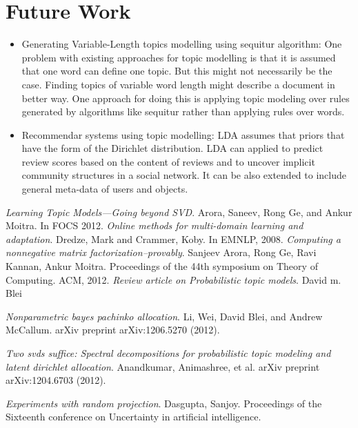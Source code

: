 \documentclass[a4paper,11pt]{article}
\begin{document}
\section{Future Work}

\begin{itemize}

\item Generating Variable-Length topics modelling using sequitur algorithm:
	One problem with existing approaches for topic modelling is that it is assumed that one word can define one topic. But this might not necessarily be the case. Finding topics of variable word length might describe a document in better way. One approach for doing this is applying topic modeling over rules generated by algorithms like sequitur rather than applying rules over words.

\item Recommendar systems using topic modelling:
	LDA assumes that priors that have the form of the Dirichlet distribution. LDA can applied to predict review scores based on the content of reviews and to uncover implicit community structures in a social network. It can be also extended to include general meta-data of users and objects.

\end{itemize}


\begin{thebibliography}{99}
 \textit{Learning Topic Models---Going beyond SVD}. Arora, Saneev, Rong Ge, and Ankur Moitra. In FOCS 2012.
 \textit{Online methods for multi-domain learning and adaptation}. Dredze, Mark and Crammer, Koby. In
EMNLP, 2008.
 \textit{Computing a nonnegative matrix factorization--provably}. Sanjeev Arora, Rong Ge, Ravi Kannan, Ankur Moitra. Proceedings of the 44th symposium on Theory of Computing. ACM, 2012.  
 \textit{Review article on Probabilistic topic models}. David m. Blei  

 \textit{Nonparametric bayes pachinko allocation}. Li, Wei, David Blei, and Andrew McCallum. arXiv preprint arXiv:1206.5270 (2012). 

 \textit{Two svds suffice: Spectral decompositions for probabilistic topic modeling and latent dirichlet allocation}. Anandkumar, Animashree, et al.  arXiv preprint arXiv:1204.6703 (2012).

 \textit{Experiments with random projection}. Dasgupta, Sanjoy. Proceedings of the Sixteenth conference on Uncertainty in artificial intelligence.


\end{thebibliography}

\pagebreak
\end{document}

